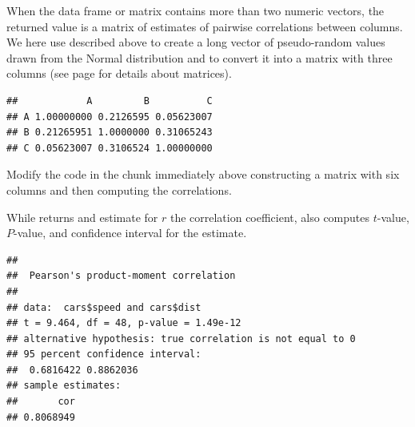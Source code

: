 \documentclass[krantz2]{krantz}\usepackage{knitr}%
\begin{document}
When the data frame or matrix contains more than two numeric vectors, the returned value is a matrix of estimates of pairwise correlations between columns. We here use  described above to create a long vector of pseudo-random values drawn from the Normal distribution and  to convert it into a matrix with three columns (see page \pageref{sec:matrix:array} for details about \Rlang matrices).

\begin{knitrout}\footnotesize
{}\color{fgcolor}\begin{kframe}
\begin{alltt}
 \hlkwb{<-} \hlstd{(}\hlstd{(}\hlstd{),}  \hlstd{=} \hlstd{,}
                  \hlstd{=} \hlstd{(} \hlstd{=} \hlopt{:}\hlstd{,}  \hlstd{=} \hlstd{(}\hlstd{,} \hlstd{,} \hlstd{)))}
\end{alltt}
\begin{verbatim}
##            A         B          C
## A 1.00000000 0.2126595 0.05623007
## B 0.21265951 1.0000000 0.31065243
## C 0.05623007 0.3106524 1.00000000
\end{verbatim}
\end{kframe}
\end{knitrout}

\begin{playground}
Modify the code in the chunk immediately above constructing a matrix with six columns and then computing the correlations.
\end{playground}

While  returns and estimate for $r$ the correlation coefficient,  also computes $t$-value, $P$-value, and confidence interval for the estimate.

\begin{knitrout}\footnotesize
{}\color{fgcolor}\begin{kframe}
\begin{alltt}
\hlstd{(} \hlopt{$}  \hlopt{$}
\end{alltt}
\begin{verbatim}
## 
## 	Pearson's product-moment correlation
## 
## data:  cars$speed and cars$dist
## t = 9.464, df = 48, p-value = 1.49e-12
## alternative hypothesis: true correlation is not equal to 0
## 95 percent confidence interval:
##  0.6816422 0.8862036
## sample estimates:
##       cor 
## 0.8068949
\end{verbatim}
\end{kframe}
\end{knitrout}
\end{document}
